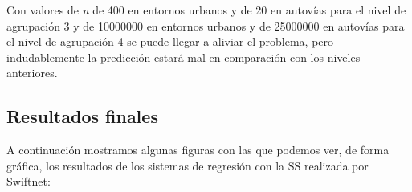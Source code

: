 Con valores de \textit{n} de 400 en entornos urbanos y de 20 en autovías para el nivel de agrupación 3 y de 10000000 en entornos urbanos y de 25000000 en autovías para el nivel de agrupación 4 se puede llegar a aliviar el problema, pero indudablemente la predicción estará mal en comparación con los niveles anteriores.


\subsection{Resultados finales}

A continuación mostramos algunas figuras con las que podemos ver, de forma gráfica, los resultados de los sistemas de regresión con la \ac{SS} realizada por Swiftnet:

